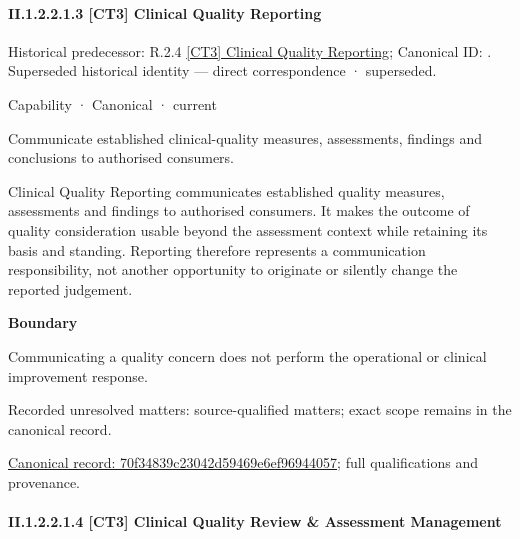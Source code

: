 \paragraph*{II.1.2.2.1.3 [CT3] Clinical Quality Reporting}
\label{navigation:II.1.2.2.1.3}

{\small Historical predecessor: R.2.4 \hyperref[element:e5812fcdf3f5465b9b1d8ba536075c5f]{[CT3] Clinical Quality Reporting}; Canonical ID: \texttt{}. Superseded historical identity — direct correspondence · superseded.}\par
\label{element:70f34839c23042d59469e6ef96944057}
{\small Capability · Canonical · current}\par

Communicate established clinical-quality measures, assessments, findings and conclusions to authorised consumers.



Clinical Quality Reporting communicates established quality measures, assessments and findings to authorised consumers. It makes the outcome of quality consideration usable beyond the assessment context while retaining its basis and standing. Reporting therefore represents a communication responsibility, not another opportunity to originate or silently change the reported judgement.



\textbf{Boundary}



Communicating a quality concern does not perform the operational or clinical improvement response.


{\small Recorded unresolved matters: source-qualified matters; exact scope remains in the canonical record.}\par
{\footnotesize \href{../../../../../../../continuum/strategy/capability/70f34839c23042d59469e6ef96944057.md}{Canonical record: 70f34839c23042d59469e6ef96944057}; full qualifications and provenance.}\par
\paragraph*{II.1.2.2.1.4 [CT3] Clinical Quality Review \& Assessment Management}
\label{navigation:II.1.2.2.1.4}

